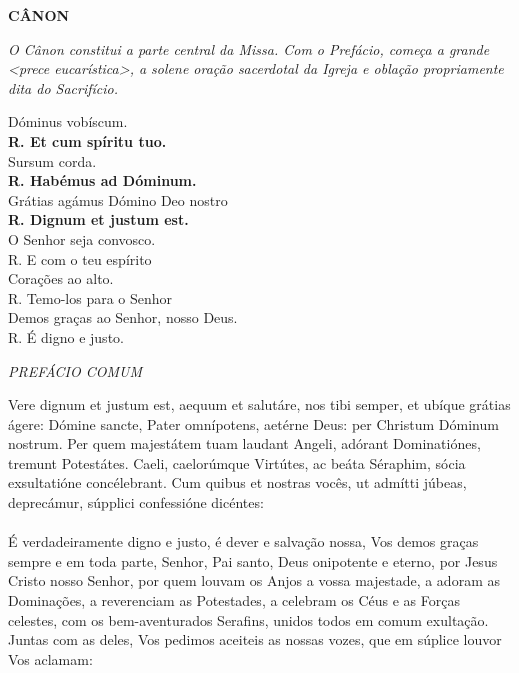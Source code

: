 \begin{center}
	\textbf{CÂNON}
\end{center}
\begin{flushleft}
\textit{O Cânon constitui a parte central da Missa. Com o Prefácio, começa a grande <prece eucarística>, a solene oração sacerdotal da Igreja e oblação propriamente dita do Sacrifício.}
\end{flushleft}

\begin{multicols}{2}
	\noindent Dóminus vobíscum.
	\\ \textbf{R. Et cum spíritu tuo.}
	\\ Sursum corda.
	\\ \textbf{R. Habémus ad Dóminum.}
	\\ Grátias agámus Dómino Deo nostro
	\\ \textbf{R. Dignum et justum est.}
	\\O Senhor seja convosco.
	\\R. E com o teu espírito
	\\ Corações ao alto.
	\\ R. Temo-los para o Senhor 
	\\ Demos graças ao Senhor, nosso Deus.
	\\ R. É digno e justo.
\end{multicols}

\begin{center}
	\textit{PREFÁCIO COMUM}
\end{center}

\begin{multicols}{2}
	\noindent Vere dignum et justum est, aequum et salutáre, nos tibi semper, et ubíque grátias ágere: Dómine sancte, Pater omnípotens,  aetérne Deus: per Christum Dóminum nostrum. Per quem majestátem tuam laudant Angeli, adórant Dominatiónes, tremunt Potestátes. Caeli, caelorúmque Virtútes, ac beáta Séraphim, sócia exsultatióne concélebrant. Cum quibus et nostras vocês, ut admítti júbeas, deprecámur, súpplici confessióne dicéntes:
	\\
	\\ É verdadeiramente digno e justo, é dever e salvação nossa, Vos demos graças sempre e em toda parte, Senhor, Pai santo, Deus onipotente e eterno, por Jesus Cristo nosso Senhor, por quem louvam os Anjos a vossa majestade, a adoram as Dominações, a reverenciam as Potestades, a celebram os Céus e as Forças celestes, com os bem-aventurados Serafins, unidos todos em comum exultação. Juntas com as deles, Vos pedimos aceiteis as nossas vozes, que em súplice louvor Vos aclamam:
\end{multicols}

